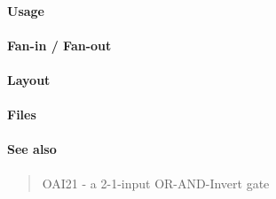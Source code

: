 \paragraph{Usage}

\paragraph{Fan-in / Fan-out}

\paragraph{Layout}

\paragraph{Files}

\paragraph{See also}
\begin{quote}
    OAI21 - a 2-1-input OR-AND-Invert gate
\end{quote}
